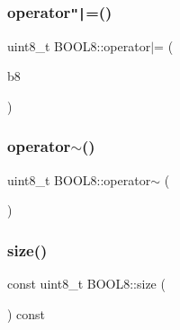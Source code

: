 \hypertarget{struct_b_o_o_l8_a514b5a432090721b3799d6abe87f6282}{}\label{struct_b_o_o_l8_a514b5a432090721b3799d6abe87f6282} 
\subsubsection{\texorpdfstring{operator\texttt{"|}=()}{operator|=()}\hspace{0.1cm}{\footnotesize\ttfamily [2/2]}}
{\footnotesize\ttfamily uint8\+\_\+t B\+O\+O\+L8\+::operator$\vert$= (\begin{DoxyParamCaption}\item[{const \hyperlink{struct_b_o_o_l8}{B\+O\+O\+L8}}]{b8 }\end{DoxyParamCaption})\hspace{0.3cm}{\ttfamily [inline]}}

\hypertarget{struct_b_o_o_l8_a3966ebe4c2b0950a237dcf0417f8989a}{}\label{struct_b_o_o_l8_a3966ebe4c2b0950a237dcf0417f8989a} 
\subsubsection{\texorpdfstring{operator$\sim$()}{operator~()}}
{\footnotesize\ttfamily uint8\+\_\+t B\+O\+O\+L8\+::operator$\sim$ (\begin{DoxyParamCaption}\item[{void}]{ }\end{DoxyParamCaption})\hspace{0.3cm}{\ttfamily [inline]}}

\hypertarget{struct_b_o_o_l8_a82bfc35d98b03e50e63d0f1ec2458d1c}{}\label{struct_b_o_o_l8_a82bfc35d98b03e50e63d0f1ec2458d1c} 
\subsubsection{\texorpdfstring{size()}{size()}}
{\footnotesize\ttfamily const uint8\+\_\+t B\+O\+O\+L8\+::size (\begin{DoxyParamCaption}{ }\end{DoxyParamCaption}) const\hspace{0.3cm}{\ttfamily [inline]}}




